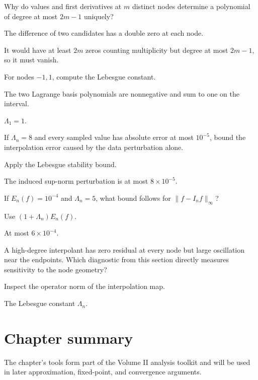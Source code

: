 \begin{exercise}\label{exr:ii20-expand-16}
Why do values and first derivatives at \(m\) distinct nodes determine a polynomial of degree at most \(2m-1\) uniquely?
\end{exercise}
\begin{hint}
The difference of two candidates has a double zero at each node.
\end{hint}
\begin{solution}
It would have at least \(2m\) zeros counting multiplicity but degree at most \(2m-1\), so it must vanish.
\end{solution}
\begin{exercise}\label{exr:ii20-lebesgue-01}
For nodes $-1,1$, compute the Lebesgue constant.
\end{exercise}
\begin{hint}
The two Lagrange basis polynomials are nonnegative and sum to one on the interval.
\end{hint}
\begin{solution}
$\Lambda_1=1$.
\end{solution}

\begin{exercise}\label{exr:ii20-lebesgue-02}
If $\Lambda_n=8$ and every sampled value has absolute error at most $10^{-5}$, bound the interpolation error caused by the data perturbation alone.
\end{exercise}
\begin{hint}
Apply the Lebesgue stability bound.
\end{hint}
\begin{solution}
The induced sup-norm perturbation is at most $8\times10^{-5}$.
\end{solution}

\begin{exercise}\label{exr:ii20-lebesgue-03}
If $E_n(f)=10^{-4}$ and $\Lambda_n=5$, what bound follows for $\|f-I_nf\|_\infty$?
\end{exercise}
\begin{hint}
Use $(1+\Lambda_n)E_n(f)$.
\end{hint}
\begin{solution}
At most $6\times10^{-4}$.
\end{solution}

\begin{exercise}\label{exr:ii20-runge-01}
A high-degree interpolant has zero residual at every node but large oscillation near the endpoints. Which diagnostic from this section directly measures sensitivity to the node geometry?
\end{exercise}
\begin{hint}
Inspect the operator norm of the interpolation map.
\end{hint}
\begin{solution}
The Lebesgue constant $\Lambda_n$.
\end{solution}

\section*{Chapter summary}
The chapter's tools form part of the Volume II analysis toolkit and will be used in later approximation, fixed-point, and convergence arguments.
